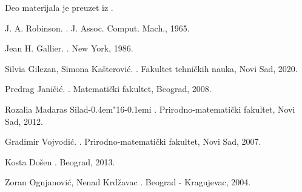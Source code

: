 \documentclass[12pt, a4paper, titlepage, twoside]{article}
\theoremstyle{definition}
\def\dj{d\kern-0.4em\char"16\kern-0.1em}
\begin{document}
Deo materijala je preuzet iz \cite{gilezan2020logika}.


\newpage
\begin{thebibliography}{100}


{J. A. Robinson.}
.
\newblock J. Assoc. Comput. Mach., 1965.

{Jean H. Gallier.}
.
\newblock New York, 1986.

{Silvia Gilezan, Simona Ka\v sterovi\'c.}
.
\newblock Fakultet tehni\v ckih nauka, Novi Sad, 2020.

{Predrag Jani\v ci\'c.}
.
\newblock Matemati\v cki fakultet, Beograd, 2008.

{Rozalia Madaras Sila\dj{}i}
.
\newblock Prirodno-matemati\v cki fakultet, Novi Sad, 2012.

{Gradimir Vojvodi\'c.}
.
\newblock Prirodno-matemati\v cki fakultet, Novi Sad, 2007.

{Kosta Do\v sen}
.
\newblock Beograd, 2013.

{Zoran Ognjanovi\'c, Nenad Krd\v zavac}
.
\newblock Beograd - Kragujevac, 2004.

\end{thebibliography}
\end{document}
